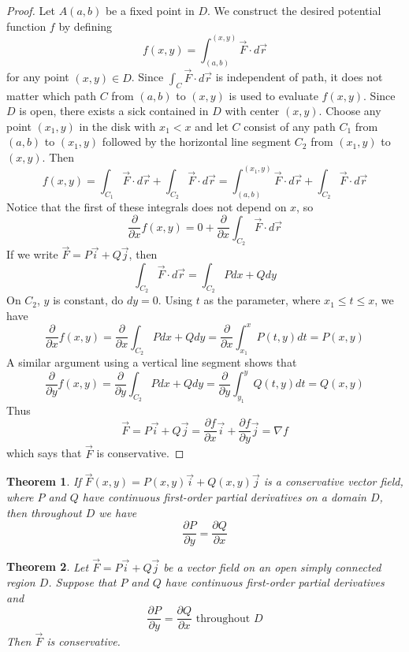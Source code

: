 \documentclass[10pt]{report}
\newtheorem{thm2}{Theorem}[section]
\newcommand{\grad}{\nabla}
\begin{document}
\begin{proof}
Let $A(a,b)$ be a fixed point in $D$. We construct the desired potential function $f$ by defining
$$f(x,y) = \int_{(a,b)}^{(x,y)} \vec{F}\cdot d\vec{r}$$
for any point $(x,y)\in D$. Since $\int_C \vec{F}\cdot d\vec{r}$ is independent of path, it does not matter which path $C$ from $(a,b)$ to $(x,y)$ is used to evaluate $f(x,y)$. Since $D$ is open, there exists a sick contained in $D$ with center $(x,y)$. Choose any point $(x_1,y)$ in the disk with $x_1 < x$ and let $C$ consist of any path $C_1$ from $(a,b)$ to $(x_1,y)$ followed by the horizontal line segment $C_2$ from $(x_1,y)$ to $(x,y)$. Then
$$f(x,y) = \int_{C_1} \vec{F}\cdot d\vec{r} + \int_{C_2} \vec{F}\cdot d\vec{r} = \int_{(a,b)}^{(x_1,y)} \vec{F}\cdot d\vec{r} + \int_{C_2} \vec{F}\cdot d\vec{r}$$
Notice that the first of these integrals does not depend on $x$, so
$$\frac{\partial}{\partial x}f(x,y) = 0 + \frac{\partial}{\partial x}\int_{C_2} \vec{F}\cdot d\vec{r}$$
If we write $\vec{F} = P\vec{i} + Q\vec{j}$, then
$$\int_{C_2} \vec{F}\cdot d\vec{r} = \int_{C_2} Pdx + Qdy$$
On $C_2$, $y$ is constant, do $dy=0$. Using $t$ as the parameter, where $x_1\leq t \leq x$, we have
$$\frac{\partial}{\partial x}f(x,y) = \frac{\partial}{\partial x}\int_{C_2}Pdx + Qdy = \frac{\partial}{\partial x}\int_{x_1}^x P(t,y)dt = P(x,y)$$
A similar argument using a vertical line segment shows that
$$\frac{\partial}{\partial y}f(x,y) = \frac{\partial}{\partial y}\int_{C_2}Pdx + Qdy = \frac{\partial}{\partial y}\int_{y_1}^y Q(t,y)dt = Q(x,y)$$
Thus
$$\vec{F} = P\vec{i}+Q\vec{j} = \frac{\partial f}{\partial x}\vec{i}+\frac{\partial f}{\partial y}\vec{j} = \grad f$$
which says that $\vec{F}$ is conservative.
\end{proof}
\begin{thm2}
If $\vec{F}(x,y)=P(x,y)\vec{i}+Q(x,y)\vec{j}$ is a conservative vector field, where $P$ and $Q$ have continuous first-order partial derivatives on a domain $D$, then throughout $D$ we have
$$\frac{\partial P}{\partial y} = \frac{\partial Q}{\partial x}$$
\end{thm2}
\begin{thm2}
Let $\vec{F}=P\vec{i}+Q\vec{j}$ be a vector field on an open simply connected region $D$. Suppose that $P$ and $Q$ have continuous first-order partial derivatives and
$$\frac{\partial P}{\partial y} = \frac{\partial Q}{\partial x} \text{  throughout } D$$
Then $\vec{F}$ is conservative.
\end{thm2}
\end{document}
